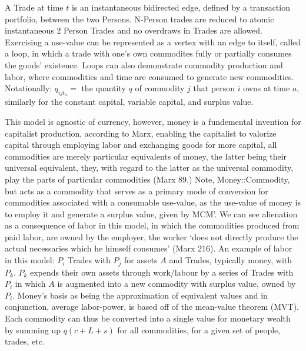 \documentclass[12pt]{article}
\begin{document}
A Trade at time $t$ is an instantaneous bidirected edge, defined by a transaction portfolio, between the two Persons.
N-Person trades are reduced to atomic instantaneous 2 Person Trades and no overdraws in Trades are allowed. 
Exercising a use-value can be represented as a vertex with an edge to itself, called a loop, in which a trade with one's own commodites fully or partially consumes the goods' existence. 
Loops can also demonstrate commodity production and labor, where commodities and time are consumed to generate new commodities. 
Notationally: $q_{ijt_{a}} =$ the quantity $q$ of commodity $j$ that person $i$ owns at time $a$, similarly for the constant capital, variable capital, and surplus value. \par

This model is agnostic of currency, however, money is a fundemental invention for capitalist production, according to Marx, enabling the capitalist to valorize capital through employing labor and exchanging goods for more capital, all commodities are merely particular equivalents of money, the latter being their universal equivalent, they, with regard to the latter as the universal commodity, play the parts of particular commodities (Marx 89.)
Note, Money::Commodity, but acts as a commodity that serves as a primary mode of conversion for commodities associated with a consumable use-value, as the use-value of money is to employ it and generate a surplus value, given by MCM'.
We can see alienation as a consequence of labor in this model, in which the commodities produced from paid labor, are owned by the employer, the worker `does not directly produce the actual necessaries which he himself consumes' (Marx 216).
An example of labor in this model: $P_i$ Trades with $P_j$ for assets $A$ and Trades, typically money, with $P_k$.
$P_k$ expends their own assets through work/labour by a series of Trades with $P_i$ in which $A$ is augmented into a new commodity with surplus value, owned by $P_i$.  
Money's basis as being the approximation of equivalent values and in conjunction, average labor-power, is based off of the mean-value theorem (MVT).
Each commodity can thus be converted into a single value for monetary wealth by summing up $q(c+L+s)$ for all commodities, for a given set of people, trades, etc. \par
\end{document}
